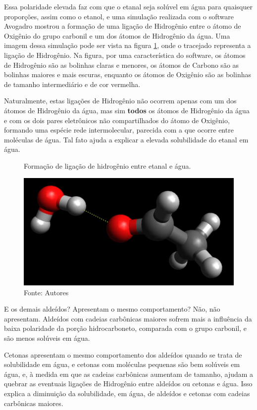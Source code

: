 Essa polaridade elevada faz com que o etanal seja solúvel em água para quaisquer proporções, assim como o etanol, e uma simulação realizada com o software Avogadro \cite{avogadro} mostrou a formação de uma ligação de Hidrogênio entre o átomo de Oxigênio do grupo carbonil e um dos átomos de Hidrogênio da água. Uma imagem dessa simulação pode ser vista na figura \ref{fig:etanalagua}, onde o tracejado representa a ligação de Hidrogênio. Na figura, por uma característica do software, os átomos de Hidrogênio são as bolinhas claras e menores, os átomos de Carbono são as bolinhas maiores e mais escuras, enquanto os átomos de Oxigênio são as bolinhas de tamanho intermediário e de cor vermelha.

Naturalmente, estas ligações de Hidrogênio não ocorrem apenas com um dos átomos de Hidrogênio da água, mas sim \textbf{todos} os átomos de Hidrogênio da água e com os dois pares eletrônicos não compartilhados do átomo de Oxigênio, formando uma espécie rede intermolecular, parecida com a que ocorre entre moléculas de água. Tal fato ajuda a explicar a elevada solubilidade do etanal em água.
 
\begin{figure}[H]
	\centering
	\vspace{0.25cm}
	\caption{Formação de ligação de hidrogênio entre etanal e água.}
	\vspace{0.25cm}
	\includegraphics[width=0.85\linewidth]{imagens/etanal_agua.png}
	\caption*{Fonte: Autores}
	\label{fig:etanalagua}
\end{figure}

E os demais aldeídos? Apresentam o mesmo comportamento? Não, não apresentam. Aldeídos com cadeias carbônicas maiores sofrem mais a influência da baixa polaridade da porção hidrocarboneto, comparada com o grupo carbonil, e são menos solúveis em água.

Cetonas apresentam o mesmo comportamento dos aldeídos quando se trata de solubilidade em água, e cetonas com moléculas pequenas são bem solúveis em água, e, à medida em que as cadeias carbônicas aumentam de tamanho, ajudam a quebrar as eventuais ligações de Hidrogênio entre aldeídos ou cetonas e água. Isso explica a diminuição da solubilidade, em água, de aldeídos e cetonas com cadeias carbônicas maiores.

